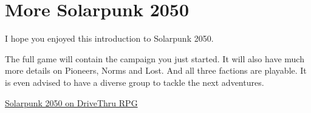 \chapter{More Solarpunk 2050}

I hope you enjoyed this introduction to Solarpunk 2050.

The full game will contain the campaign you just started. It will also have much more details on Pioneers, Norms and Lost.
And all three factions are playable. It is even advised to have a diverse group to tackle the next adventures.

\vspace{1cm}
\begin{center}
\href{https://www.drivethrurpg.com/product/443881/Solarpunk-2050?affiliate_id=490747}{Solarpunk 2050 on DriveThru RPG}
\end{center}